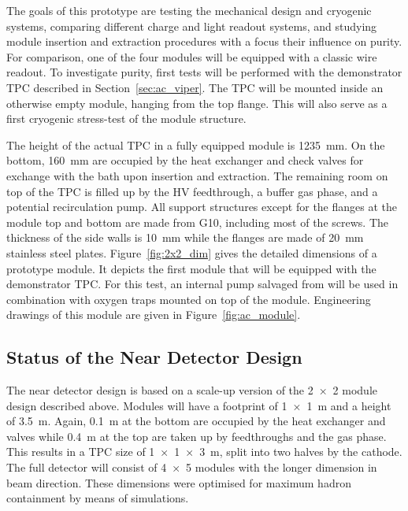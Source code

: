 The goals of this prototype are testing the mechanical design and cryogenic systems, comparing different charge and light readout systems, and studying module insertion and extraction procedures with a focus their influence on purity.
For comparison, one of the four modules will be equipped with a classic wire readout.
To investigate purity, first tests will be performed with the \AC{} demonstrator TPC described in Section~\ref{sec:ac_viper}.
The TPC will be mounted inside an otherwise empty module, hanging from the top flange.
This will also serve as a first cryogenic stress-test of the module structure.

The height of the actual TPC in a fully equipped module is \SI{1235}{\milli\metre}.
On the bottom, \SI{160}{\milli\metre} are occupied by the heat exchanger and check valves for \lar{} exchange with the bath upon insertion and extraction.
The remaining room on top of the TPC is filled up by the HV feedthrough, a buffer gas phase, and a potential recirculation pump.
All support structures except for the flanges at the module top and bottom are made from G10, including most of the screws.
The thickness of the side walls is \SI{10}{\milli\metre} while the flanges are made of \SI{20}{\milli\metre} stainless steel plates.
Figure~\ref{fig:2x2_dim} gives the detailed dimensions of a prototype module.
It depicts the first module that will be equipped with the demonstrator TPC.
For this test, an internal pump salvaged from \AT{} will be used in combination with oxygen traps mounted on top of the module.
Engineering drawings of this module are given in Figure~\ref{fig:ac_module}.


\subsection*{Status of the Near Detector Design}

The \AC{} near detector design is based on a scale-up version of the \num{2 x 2} module design described above.
Modules will have a footprint of \SI{1 x 1}{\metre} and a height of \SI{3.5}{\metre}.
Again, \SI{0.1}{\metre} at the bottom are occupied by the heat exchanger and valves while \SI{0.4}{\metre} at the top are taken up by feedthroughs and the gas phase.
This results in a TPC size of \SI{1 x 1 x 3}{\metre}, split into two halves by the cathode.
The full detector will consist of \num{4 x 5} modules with the longer dimension in beam direction.
These dimensions were optimised for maximum hadron containment by means of simulations.

\afterpage{\clearpage}